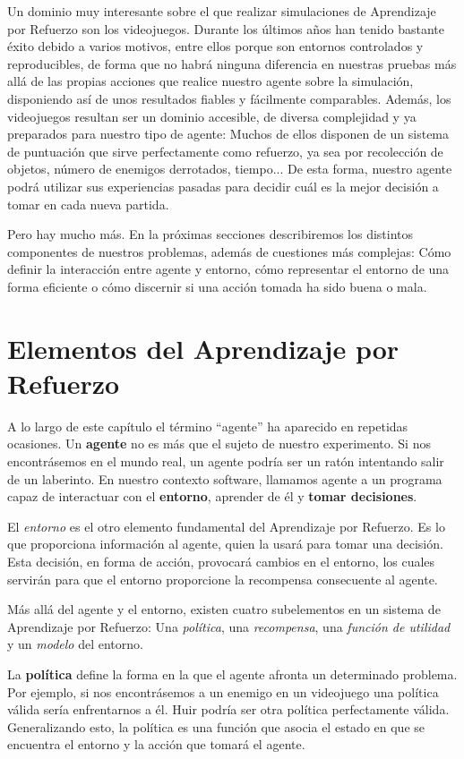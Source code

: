 Un dominio muy interesante sobre el que realizar simulaciones de Aprendizaje por Refuerzo son los videojuegos. Durante los últimos años han tenido bastante éxito debido a varios motivos, entre ellos porque son entornos controlados y reproducibles, de forma que no habrá ninguna diferencia en nuestras pruebas más allá de las propias acciones que realice nuestro agente sobre la simulación, disponiendo así de unos resultados fiables y fácilmente comparables. Además, los videojuegos resultan ser un dominio accesible, de diversa complejidad y ya preparados para nuestro tipo de agente: Muchos de ellos disponen de un sistema de puntuación que sirve perfectamente como refuerzo, ya sea por recolección de objetos, número de enemigos derrotados, tiempo... De esta forma, nuestro agente podrá utilizar sus experiencias pasadas para decidir cuál es la mejor decisión a tomar en cada nueva partida.

Pero hay mucho más. En la próximas secciones describiremos los distintos componentes de nuestros problemas, además de cuestiones más complejas: Cómo definir la interacción entre agente y entorno, cómo representar el entorno de una forma eficiente o cómo discernir si una acción tomada ha sido buena o mala.

\section{Elementos del Aprendizaje por Refuerzo}
A lo largo de este capítulo el término ``agente'' ha aparecido en repetidas ocasiones. Un \textbf{agente} no es más que el sujeto de nuestro experimento. Si nos encontrásemos en el mundo real, un agente podría ser un ratón intentando salir de un laberinto. En nuestro contexto software, llamamos agente a un programa capaz de interactuar con el \textbf{entorno}, aprender de él y \textbf{tomar decisiones}.

El \textit{entorno} es el otro elemento fundamental del Aprendizaje por Refuerzo. Es lo que proporciona información al agente, quien la usará para tomar una decisión. Esta decisión, en forma de acción, provocará cambios en el entorno, los cuales servirán para que el entorno proporcione la recompensa consecuente al agente.

Más allá del agente y el entorno, existen cuatro subelementos en un sistema de Aprendizaje por Refuerzo: Una \textit{política}, una \textit{recompensa}, una \textit{función de utilidad} y un \textit{modelo} del entorno.

La \textbf{política} define la forma en la que el agente afronta un determinado problema. Por ejemplo, si nos encontrásemos a un enemigo en un videojuego una política válida sería enfrentarnos a él. Huir podría ser otra política perfectamente válida. Generalizando esto, la política es una función que asocia el estado en que se encuentra el entorno y la acción que tomará el agente.


